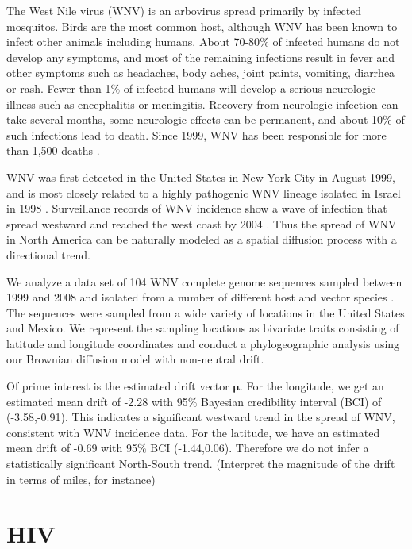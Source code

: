 \documentclass[12pt]{article}
\begin{document}
The West Nile virus (WNV) is an arbovirus spread primarily by infected mosquitos.  Birds are the most common host,
although WNV has been known to infect other animals including humans.  About 70-80$\%$ of infected humans do not 
develop any symptoms, and most of the remaining infections result in fever and other symptoms such as headaches,
body aches, joint paints, vomiting, diarrhea or rash.  Fewer than 1$\%$ of infected humans will develop a serious
neurologic illness such as encephalitis or meningitis.  Recovery from neurologic infection can take several months, 
some neurologic effects can be permanent, and about 10$\%$ of such infections lead to death.
Since 1999, WNV has been responsible for more than 1,500 deaths \citep{CDC2013}.
\par
WNV was first detected in the United States in New York City in August 1999, and is most closely 
related to a highly pathogenic WNV lineage isolated in Israel in 1998 \citep{Lanciotti1999}.  
Surveillance records of WNV incidence show a wave of infection that spread westward and reached the west
coast by 2004 \citep{CDC2013}.  Thus the spread of WNV in North America can be naturally modeled as a spatial
diffusion process with a directional trend.
\par
We analyze a data set of 104 WNV complete genome sequences sampled between 1999 and 2008 and isolated from a 
number of different host and vector species \citep{Pybus2012}.  The sequences were sampled from a wide variety 
of locations in the United States and Mexico.  We represent the sampling locations as bivariate traits consisting
of latitude and longitude coordinates and conduct a phylogeographic analysis using our Brownian diffusion model
with non-neutral drift.
\par
Of prime interest is the estimated drift vector $\boldsymbol \mu$.  For the longitude, we get an estimated mean drift of 
-2.28 with 95$\%$ Bayesian credibility interval (BCI) of (-3.58,-0.91).  This indicates a significant westward trend in
the spread of WNV, consistent with WNV incidence data.  For the latitude, we have an estimated mean drift of -0.69 with
95$\%$ BCI (-1.44,0.06).  Therefore we do not infer a statistically significant North-South trend. (Interpret the magnitude 
of the drift in terms of miles, for instance)




\section{HIV} 
\end{document}

